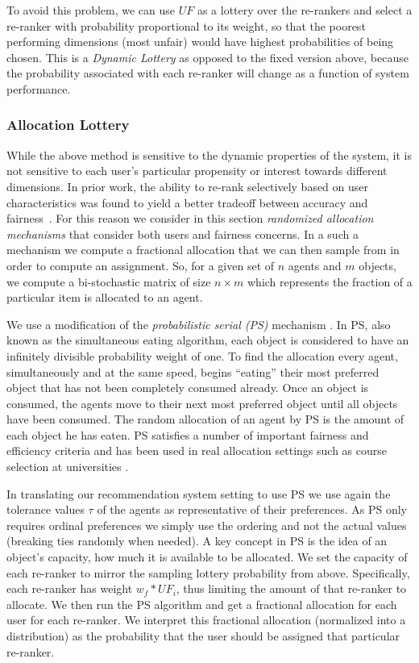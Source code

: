 To avoid this problem, we can use $UF$ as a lottery over the re-rankers and select a re-ranker with probability proportional to its weight, so that the poorest performing dimensions (most unfair) would have highest probabilities of being chosen. This is a \textit{Dynamic Lottery} as opposed to the fixed version above, because the probability associated with each re-ranker will change as a function of system performance. 

\subsubsection{Allocation Lottery}
While the above method is sensitive to the dynamic properties of the system, it is not sensitive to each user's particular propensity or interest towards different dimensions. In prior work, the ability to re-rank selectively based on user characteristics was found to yield a better tradeoff between accuracy and fairness~\cite{liu2019personalized,sonboli-umap-2020}. For this reason we consider in this section \emph{randomized allocation mechanisms} that consider both users and fairness concerns.  In a such a mechanism we compute a fractional allocation that we can then sample from in order to compute an assignment.  So, for a given set of $n$ agents and $m$ objects, we compute a bi-stochastic matrix of size $n \times m$ which represents the fraction of a particular item is allocated to an agent.

We use a modification of the \emph{probabilistic serial (PS)} mechanism \cite{bogomolnaia2001new}.  In PS, also known as the simultaneous eating algorithm, each object is considered to have an infinitely divisible probability weight of one.  To find the allocation every agent, simultaneously and at the same speed, begins ``eating'' their most preferred object that has not been completely consumed already.  Once an object is consumed, the agents move to their next most preferred object until all objects have been consumed. The random allocation of an agent by PS is the amount of each object he has eaten. PS satisfies a number of important fairness and efficiency criteria \cite{Aziz:EqulibriaPS,Aziz:EgalRandom} and has been used in real allocation settings such as course selection at universities \cite{budish2013designing}.

In translating our recommendation system setting to use PS we use again the tolerance values $\tau$ of the agents as representative of their preferences. As PS only requires ordinal preferences we simply use the ordering and not the actual values (breaking ties randomly when needed). A key concept in PS is the idea of an object's capacity, how much it is available to be allocated. 
We set the capacity of each re-ranker to mirror the sampling lottery probability from above.
Specifically, each re-ranker has weight $w_f * UF_i$, thus limiting the amount of that re-ranker to allocate.
We then run the PS algorithm and get a fractional allocation for each user for each re-ranker.  We interpret this fractional allocation (normalized into a distribution) as the probability that the user should be assigned that particular re-ranker.


